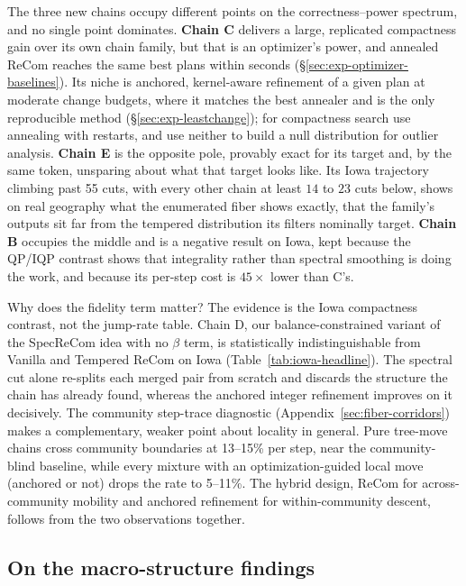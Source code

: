 \documentclass[11pt]{article}
\begin{document}
The three new chains occupy different points on the
correctness--power spectrum, and no single point dominates.
\textbf{Chain C} delivers a large, replicated compactness gain over
its own chain family, but that is an optimizer's power, and annealed
ReCom reaches the same best plans within seconds
(\S\ref{sec:exp-optimizer-baselines}). Its niche is anchored,
kernel-aware refinement of a given plan at moderate change budgets,
where it matches the best annealer and is the only reproducible
method (\S\ref{sec:exp-leastchange}); for compactness search use
annealing with restarts, and use neither to build a null distribution
for outlier analysis. \textbf{Chain E} is the opposite pole,
provably exact for its target and, by the same token, unsparing about
what that target looks like. Its Iowa trajectory climbing past 55
cuts, with every other chain at least $14$ to $23$ cuts below, shows
on real geography what the enumerated fiber shows exactly, that the
family's outputs sit far from the tempered distribution its filters
nominally target. \textbf{Chain B} occupies the middle and is a
negative result on Iowa, kept because the QP/IQP contrast shows that
integrality rather than spectral smoothing is doing the work, and
because its per-step cost is $45\times$ lower than C's.

Why does the fidelity term matter? The evidence is the Iowa
compactness contrast, not the jump-rate table. Chain D, our
balance-constrained variant of the SpecReCom idea with no $\beta$
term, is statistically indistinguishable from Vanilla and Tempered
ReCom on Iowa (Table~\ref{tab:iowa-headline}). The spectral cut alone
re-splits each merged pair from scratch and discards the structure the
chain has already found, whereas the anchored integer refinement
improves on it decisively. The community step-trace diagnostic
(Appendix~\ref{sec:fiber-corridors}) makes a complementary, weaker point
about locality in general. Pure tree-move chains cross community
boundaries at 13--15\% per step, near the community-blind baseline,
while every mixture with an optimization-guided local move (anchored
or not) drops the rate to 5--11\%. The hybrid design, ReCom for
across-community mobility and anchored refinement for
within-community descent, follows from the two observations
together.

\subsection{On the macro-structure findings}\label{sec:disc-throats}
\end{document}
